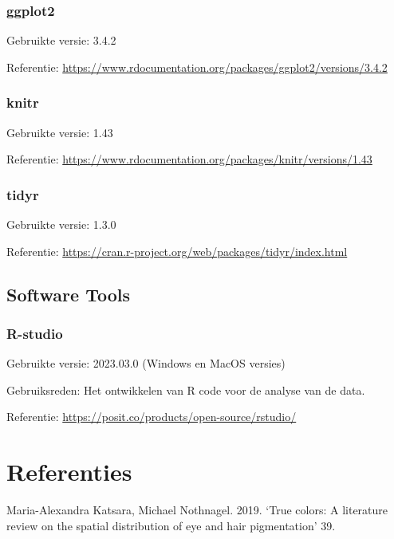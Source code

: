 \documentclass[
]{article}
\newlength{\cslhangindent}
\newlength{\cslentryspacingunit} %
\newenvironment{CSLReferences}[2] %
 {%
  \setlength{\parindent}{0pt}
  \ifodd #1
  \let\oldpar\par
  \def\par{\hangindent=\cslhangindent\oldpar}
  \fi
  \setlength{\parskip}{#2\cslentryspacingunit}
 }%
 {}
\begin{document}
\hypertarget{ggplot2}{%
\subsubsection{\texorpdfstring{\textbf{ggplot2}}{ggplot2}}\label{ggplot2}}

Gebruikte versie: 3.4.2

Referentie:
\url{https://www.rdocumentation.org/packages/ggplot2/versions/3.4.2}

\hypertarget{knitr}{%
\subsubsection{\texorpdfstring{\textbf{knitr}}{knitr}}\label{knitr}}

Gebruikte versie: 1.43

Referentie:
\url{https://www.rdocumentation.org/packages/knitr/versions/1.43}

\hypertarget{tidyr}{%
\subsubsection{tidyr}\label{tidyr}}

Gebruikte versie: 1.3.0

Referentie: \url{https://cran.r-project.org/web/packages/tidyr/index.html}

\hypertarget{software-tools}{%
\subsection{Software Tools}\label{software-tools}}

\hypertarget{r-studio}{%
\subsubsection{R-studio}\label{r-studio}}

Gebruikte versie: 2023.03.0 (Windows en MacOS versies)

Gebruiksreden: Het ontwikkelen van R code voor de analyse van de data.

Referentie: \url{https://posit.co/products/open-source/rstudio/}

\hypertarget{referenties}{%
\section*{Referenties}\label{referenties}}

\hypertarget{refs}{}
\begin{CSLReferences}{1}{0}
\leavevmode{}%
Maria-Alexandra Katsara, Michael Nothnagel. 2019. {`True colors: A literature review on the spatial distribution of eye and hair pigmentation'} 39.

\end{CSLReferences}
\end{document}

